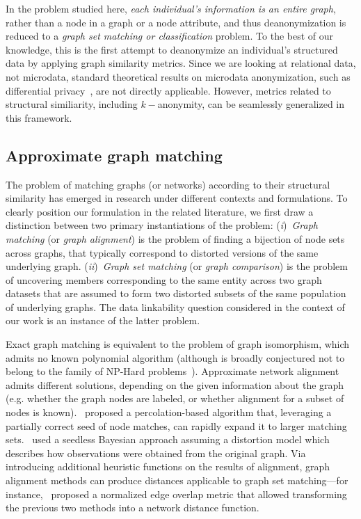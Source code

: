 In the problem studied here, \emph{each individual's information is an entire graph}, rather than a node in a graph or a node attribute, and thus deanonymization is reduced to a \emph{graph set matching or classification} problem.
To the best of our knowledge, this is the first attempt to deanonymize an individual's structured data by applying graph similarity metrics.
Since we are looking at relational data, not microdata, standard theoretical results on microdata anonymization, such as differential privacy~\citep{dwork2006calibrating}, are not directly applicable.
However, metrics related to structural similiarity, including $k-$anonymity, can be seamlessly generalized in this framework.

\subsection{Approximate graph matching}
The problem of matching graphs (or networks) according to their structural similarity has emerged in research under different contexts and formulations. To clearly position our formulation in the related literature, we first draw a distinction between two primary instantiations of the problem: (\emph{i})~\emph{Graph matching} (or \emph{graph alignment}) is the problem of finding a bijection of node sets across graphs, that typically correspond to distorted versions of the same underlying graph. (\emph{ii})~\emph{Graph set matching} (or \emph{graph comparison}) is the problem of uncovering members corresponding to the same entity across two graph datasets that are assumed to form two distorted subsets of the same population of underlying graphs. The data linkability question considered in the context of our work is an instance of the latter problem.

Exact graph matching is equivalent to the problem of graph isomorphism, which admits no known polynomial algorithm (although is broadly conjectured not to belong to the family of NP-Hard problems~\citep{schoening88}). Approximate network alignment admits different solutions, depending on the given information about the graph (e.g. whether the graph nodes are labeled, or whether alignment for a subset of nodes is known).~\textcite{kazemi15} proposed a percolation-based algorithm that, leveraging a partially correct seed of node matches, can rapidly expand it to larger matching sets.~\textcite{pedarsani13} used a seedless Bayesian approach assuming a distortion model which describes how observations were obtained from the original graph. Via introducing additional heuristic functions on the results of alignment, graph alignment methods can produce distances applicable to graph set matching---for instance,~\textcite{mishinev20} proposed a normalized edge overlap metric that allowed transforming the previous two methods into a network distance function.

